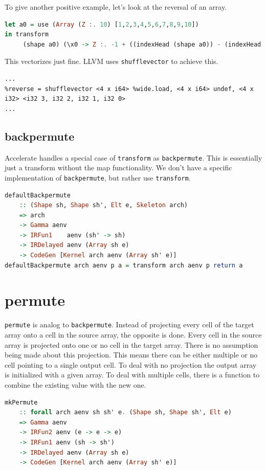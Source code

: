 \documentclass[a4paper,bibliography=totocnumbered,parskip,headsepline]{scrbook}
\begin{document}
To give another positive example, let's look at the reversal of an array.
\begin{lstlisting}[language=haskell]
let a0 = use (Array (Z :. 10) [1,2,3,4,5,6,7,8,9,10])
in transform
     (shape a0) (\x0 -> Z :. -1 + ((indexHead (shape a0)) - (indexHead x0))) (\x0 -> 1 + x0) a0
\end{lstlisting}
This vectorizes just fine.
LLVM uses \lstinline{shufflevector} to achieve this.
\begin{lstlisting}
...
%reverse = shufflevector <4 x i64> %wide.load, <4 x i64> undef, <4 x i32> <i32 3, i32 2, i32 1, i32 0>
...
\end{lstlisting}

\subsection{backpermute}
Accelerate handles a special case of \lstinline[language=haskell]!transform! as \lstinline[language=haskell]!backpermute!.
This is essentially just a transform without the map functionality.
We don't have a specific implementation of \lstinline[language=haskell]!backpermute!, but rather use \lstinline[language=haskell]!transform!.
\begin{lstlisting}[language=haskell]
defaultBackpermute
    :: (Shape sh, Shape sh', Elt e, Skeleton arch)
    => arch
    -> Gamma aenv
    -> IRFun1    aenv (sh' -> sh)
    -> IRDelayed aenv (Array sh e)
    -> CodeGen [Kernel arch aenv (Array sh' e)]
defaultBackpermute arch aenv p a = transform arch aenv p return a
\end{lstlisting}

\section{permute}
\lstinline[language=haskell]!permute! is analog to \lstinline[language=haskell]!backpermute!.
Instead of projecting every cell of the target array onto a cell in the source array, the opposite is done.
Every cell in the source array is projected onto one or no cell in the target array.
There is no assumption being made about this projection.
This means there can be either multiple or no cell pointing to a single output cell.
To deal with no projection the output array is initialized with a given array.
To deal with multiple cells, there is a function to combine the existing value with the new one.
\begin{lstlisting}[language=haskell]
mkPermute
    :: forall arch aenv sh sh' e. (Shape sh, Shape sh', Elt e)
    => Gamma aenv
    -> IRFun2 aenv (e -> e -> e)
    -> IRFun1 aenv (sh -> sh')
    -> IRDelayed aenv (Array sh e)
    -> CodeGen [Kernel arch aenv (Array sh' e)]
\end{lstlisting}
\end{document}

